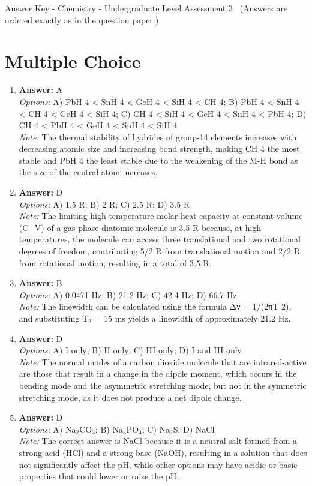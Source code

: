 \documentclass[12pt]{article}
\begin{document}
\begin{center}
Answer Key - Chemistry - Undergraduate Level Assessment 3 \
\small (Answers are ordered exactly as in the question paper.)
\end{center}

\section*{Multiple Choice}
\begin{enumerate}[label=\arabic*.]
\item \textbf{Answer:} A
\\ \textit{Options:} A) PbH 4 \textless{} SnH 4 \textless{} GeH 4 \textless{} SiH 4 \textless{} CH 4; B) PbH 4 \textless{} SnH 4 \textless{} CH 4 \textless{} GeH 4 \textless{} SiH 4; C) CH 4 \textless{} SiH 4 \textless{} GeH 4 \textless{} SnH 4 \textless{} PbH 4; D) CH 4 \textless{} PbH 4 \textless{} GeH 4 \textless{} SnH 4 \textless{} SiH 4
\\ \textit{Note:} The thermal stability of hydrides of group-14 elements increases with decreasing atomic size and increasing bond strength, making CH 4 the most stable and PbH 4 the least stable due to the weakening of the M-H bond as the size of the central atom increases.
\item \textbf{Answer:} D
\\ \textit{Options:} A) 1.5 R; B) 2 R; C) 2.5 R; D) 3.5 R
\\ \textit{Note:} The limiting high-temperature molar heat capacity at constant volume (C\_V) of a gas-phase diatomic molecule is 3.5 R because, at high temperatures, the molecule can access three translational and two rotational degrees of freedom, contributing 5/2 R from translational motion and 2/2 R from rotational motion, resulting in a total of 3.5 R.
\item \textbf{Answer:} B
\\ \textit{Options:} A) 0.0471 Hz; B) 21.2 Hz; C) 42.4 Hz; D) 66.7 Hz
\\ \textit{Note:} The linewidth can be calculated using the formula Δν = 1/(2πT 2), and substituting T$_{2}$ = 15 ms yields a linewidth of approximately 21.2 Hz.
\item \textbf{Answer:} D
\\ \textit{Options:} A) I only; B) II only; C) III only; D) I and III only
\\ \textit{Note:} The normal modes of a carbon dioxide molecule that are infrared-active are those that result in a change in the dipole moment, which occurs in the bending mode and the asymmetric stretching mode, but not in the symmetric stretching mode, as it does not produce a net dipole change.
\item \textbf{Answer:} D
\\ \textit{Options:} A) Na$_{2}$CO$_{3}$; B) Na$_{3}$PO$_{4}$; C) Na$_{2}$S; D) NaCl
\\ \textit{Note:} The correct answer is NaCl because it is a neutral salt formed from a strong acid (HCl) and a strong base (NaOH), resulting in a solution that does not significantly affect the pH, while other options may have acidic or basic properties that could lower or raise the pH.
\end{enumerate}
\end{document}
